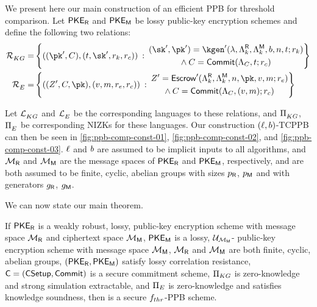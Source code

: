 We present here our main construction of an efficient PPB for threshold comparison.
Let ${{\mathsf{PKE}_{{\mathsf{R}}}}}$ and ${{\mathsf{PKE}_{{\mathsf{M}}}}}$ be lossy public-key encryption schemes and define the following two relations:
\begin{align*}
	\kgrel^{} = & \left\{
	((\pk', \com), (\thr, \sk', r_k, r_c)) \::\:
	\begin{gathered}
		(\sk', \pk') = \kgen'(\lambda, \revpp, \matpp, \base, \numdigits, \thr; r_k) \\
		\wedge \: \com = \commit(\comparams, \thr; r_c)
	\end{gathered}
	\right\}              \\
	\erel^{} =  & \left\{
	((Z', \com, \pk), (\uval, \msg, r_e, r_c)) \::\:
	\begin{gathered}
		Z' = \escrow'(\revpp, \matpp, \numdigits, \pk, \uval, \msg; r_e) \\
		\wedge \: \com = \commit(\comparams, (\uval, \msg); r_c)
	\end{gathered}
	\right\}
\end{align*}

Let $\mathcal{L}_{KG}^{}$ and $\mathcal{L}_{E}^{}$ be the corresponding languages to these relations, and
$\Pi_{KG}^{}$, $\Pi_{E}^{}$ be corresponding NIZKs for these languages.
Our construction $(\ell, b)$-TCPPB can then be seen in \cref{fig:ppb-comp-const-01}, \cref{fig:ppb-comp-const-02}, and \cref{fig:ppb-comp-const-03}.
$\ell$ and $b$ are assumed to be implicit inputs to all algorithms, and $\mathcal{M}_{{\mathsf{R}}}$ and $\mathcal{M}_{{\mathsf{M}}}$ are the message spaces of $\mathsf{PKE}_{{\mathsf{R}}}$ and $\mathsf{PKE}_{{\mathsf{M}}}$, respectively, and are both assumed to be finite, cyclic, abelian groups with sizes $p_{{\mathsf{R}}}$, $p_{{\mathsf{M}}}$ and with generators $g_{{\mathsf{R}}}$, $g_{{\mathsf{M}}}$.





We can now state our main theorem.

\begin{theorem}
	\label{thm:ppbs-main}
	If ${{\mathsf{PKE}_{{\mathsf{R}}}}}$ is a weakly robust, lossy, \wlap{} public-key encryption scheme with message space $\mathcal{M}_{{\mathsf{R}}}$ and ciphertext space $\mathcal{M}_{{\mathsf{M}}}$, ${{\mathsf{PKE}_{{\mathsf{M}}}}}$ is a lossy, $\mathcal{U}_{\mathcal{M}_{{\mathsf{M}}}}$-\slap{} public-key encryption scheme with message space $\mathcal{M}_{{\mathsf{M}}}$, $\mathcal{M}_{{\mathsf{R}}}$ and $\mathcal{M}_{{\mathsf{M}}}$ are both finite, cyclic, abelian groups, $({{\mathsf{PKE}_{{\mathsf{R}}}}}, {{\mathsf{PKE}_{{\mathsf{M}}}}})$ satisfy lossy correlation resistance, $\mathsf{C} = ({\sf CSetup}, {\sf Commit})$ is a secure commitment scheme, $\Pi_{KG}$ is zero-knowledge and strong simulation extractable, and $\Pi_{E}$ is zero-knowledge and satisfies knowledge soundness, then \schemename{} is a secure $f_{thr}$-PPB scheme.
\end{theorem}

